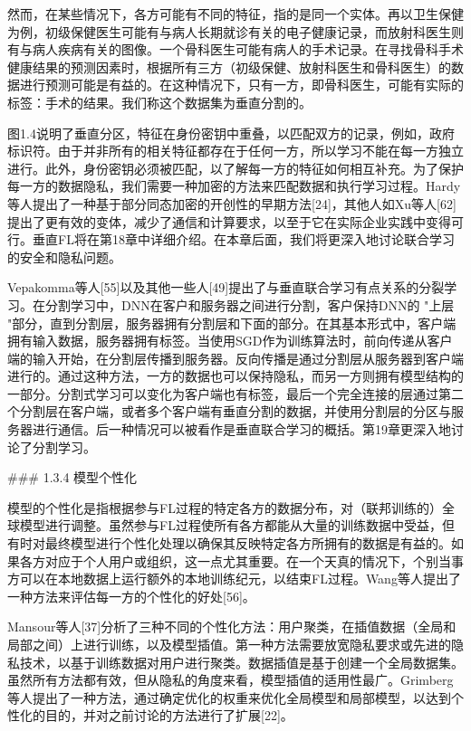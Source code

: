 然而，在某些情况下，各方可能有不同的特征，指的是同一个实体。再以卫生保健为例，初级保健医生可能有与病人长期就诊有关的电子健康记录，而放射科医生则有与病人疾病有关的图像。一个骨科医生可能有病人的手术记录。在寻找骨科手术健康结果的预测因素时，根据所有三方（初级保健、放射科医生和骨科医生）的数据进行预测可能是有益的。在这种情况下，只有一方，即骨科医生，可能有实际的标签：手术的结果。我们称这个数据集为垂直分割的。

图1.4说明了垂直分区，特征在身份密钥中重叠，以匹配双方的记录，例如，政府标识符。由于并非所有的相关特征都存在于任何一方，所以学习不能在每一方独立进行。此外，身份密钥必须被匹配，以了解每一方的特征如何相互补充。为了保护每一方的数据隐私，我们需要一种加密的方法来匹配数据和执行学习过程。Hardy等人提出了一种基于部分同态加密的开创性的早期方法[24]，其他人如Xu等人[62]提出了更有效的变体，减少了通信和计算要求，以至于它在实际企业实践中变得可行。垂直FL将在第18章中详细介绍。在本章后面，我们将更深入地讨论联合学习的安全和隐私问题。

Vepakomma等人[55]以及其他一些人[49]提出了与垂直联合学习有点关系的分裂学习。在分割学习中，DNN在客户和服务器之间进行分割，客户保持DNN的 "上层 "部分，直到分割层，服务器拥有分割层和下面的部分。在其基本形式中，客户端拥有输入数据，服务器拥有标签。当使用SGD作为训练算法时，前向传递从客户端的输入开始，在分割层传播到服务器。反向传播是通过分割层从服务器到客户端进行的。通过这种方法，一方的数据也可以保持隐私，而另一方则拥有模型结构的一部分。分割式学习可以变化为客户端也有标签，最后一个完全连接的层通过第二个分割层在客户端，或者多个客户端有垂直分割的数据，并使用分割层的分区与服务器进行通信。后一种情况可以被看作是垂直联合学习的概括。第19章更深入地讨论了分割学习。

### 1.3.4 模型个性化

模型的个性化是指根据参与FL过程的特定各方的数据分布，对（联邦训练的）全球模型进行调整。虽然参与FL过程使所有各方都能从大量的训练数据中受益，但有时对最终模型进行个性化处理以确保其反映特定各方所拥有的数据是有益的。如果各方对应于个人用户或组织，这一点尤其重要。在一个天真的情况下，个别当事方可以在本地数据上运行额外的本地训练纪元，以结束FL过程。Wang等人提出了一种方法来评估每一方的个性化的好处[56]。

Mansour等人[37]分析了三种不同的个性化方法：用户聚类，在插值数据（全局和局部之间）上进行训练，以及模型插值。第一种方法需要放宽隐私要求或先进的隐私技术，以基于训练数据对用户进行聚类。数据插值是基于创建一个全局数据集。虽然所有方法都有效，但从隐私的角度来看，模型插值的适用性最广。Grimberg等人提出了一种方法，通过确定优化的权重来优化全局模型和局部模型，以达到个性化的目的，并对之前讨论的方法进行了扩展[22]。

